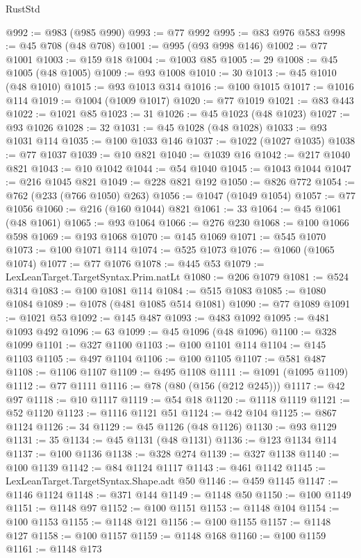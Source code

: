 \begin{lexlean}{RustStd}
\begin{coremodule}
@992 := @983 (@985 @990)
@993 := @77 @992
@995 := @83 @976 @583
@998 := @45 @708 (@48 @708)
@1001 := @995 (@93 @998 @146)
@1002 := @77 @1001
@1003 := @159 @18
@1004 := @1003 @85
@1005 := 29
@1008 := @45 @1005 (@48 @1005)
@1009 := @93 @1008
@1010 := 30
@1013 := @45 @1010 (@48 @1010)
@1015 := @93 @1013 @314
@1016 := @100 @1015
@1017 := @1016 @114
@1019 := @1004 (@1009 @1017)
@1020 := @77 @1019
@1021 := @83 @443
@1022 := @1021 @85
@1023 := 31
@1026 := @45 @1023 (@48 @1023)
@1027 := @93 @1026
@1028 := 32
@1031 := @45 @1028 (@48 @1028)
@1033 := @93 @1031 @114
@1035 := @100 @1033 @146
@1037 := @1022 (@1027 @1035)
@1038 := @77 @1037
@1039 := @10 @821
@1040 := @1039 @16
@1042 := @217 @1040 @821
@1043 := @10 @1042
@1044 := @54 @1040
@1045 := @1043 @1044
@1047 := @216 @1045 @821
@1049 := @228 @821 @192
@1050 := @826 @772
@1054 := @762 (@233 (@766 @1050) @263)
@1056 := @1047 (@1049 @1054)
@1057 := @77 @1056
@1060 := @216 (@160 @1044) @821
@1061 := 33
@1064 := @45 @1061 (@48 @1061)
@1065 := @93 @1064
@1066 := @276 @230
@1068 := @100 @1066 @598
@1069 := @193 @1068
@1070 := @145 @1069
@1071 := @545 @1070
@1073 := @100 @1071 @114
@1074 := @525 @1073
@1076 := @1060 (@1065 @1074)
@1077 := @77 @1076
@1078 := @445 @53
@1079 := LexLeanTarget.TargetSyntax.Prim.natLt
@1080 := @206 @1079
@1081 := @524 @314
@1083 := @100 @1081 @114
@1084 := @515 @1083
@1085 := @1080 @1084
@1089 := @1078 (@481 @1085 @514 @1081)
@1090 := @77 @1089
@1091 := @1021 @53
@1092 := @145 @487
@1093 := @483 @1092
@1095 := @481 @1093 @492
@1096 := 63
@1099 := @45 @1096 (@48 @1096)
@1100 := @328 @1099
@1101 := @327 @1100
@1103 := @100 @1101 @114
@1104 := @145 @1103
@1105 := @497 @1104
@1106 := @100 @1105
@1107 := @581 @487
@1108 := @1106 @1107
@1109 := @495 @1108
@1111 := @1091 (@1095 @1109)
@1112 := @77 @1111
@1116 := @78 (@80 (@156 (@212 @245)))
@1117 := @42 @97
@1118 := @10 @1117
@1119 := @54 @18
@1120 := @1118 @1119
@1121 := @52 @1120
@1123 := @1116 @1121 @51
@1124 := @42 @104
@1125 := @867 @1124
@1126 := 34
@1129 := @45 @1126 (@48 @1126)
@1130 := @93 @1129
@1131 := 35
@1134 := @45 @1131 (@48 @1131)
@1136 := @123 @1134 @114
@1137 := @100 @1136
@1138 := @328 @274
@1139 := @327 @1138
@1140 := @100 @1139
@1142 := @84 @1124 @1117
@1143 := @461 @1142
@1145 := LexLeanTarget.TargetSyntax.Shape.adt @50
@1146 := @459 @1145
@1147 := @1146 @1124
@1148 := @371 @144
@1149 := @1148 @50
@1150 := @100 @1149
@1151 := @1148 @97
@1152 := @100 @1151
@1153 := @1148 @104
@1154 := @100 @1153
@1155 := @1148 @121
@1156 := @100 @1155
@1157 := @1148 @127
@1158 := @100 @1157
@1159 := @1148 @168
@1160 := @100 @1159
@1161 := @1148 @173

\end{coremodule}
\end{lexlean}
